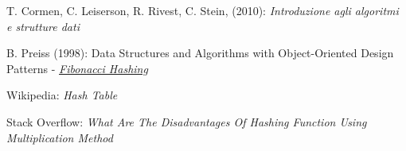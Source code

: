 \newpage

\begin{thebibliography}{}

T. Cormen, C. Leiserson, R. Rivest, C. Stein, (2010): \emph{Introduzione agli algoritmi e strutture dati}

B. Preiss (1998): Data Structures and Algorithms with Object-Oriented Design Patterns - \href{www.google.com}{\emph{Fibonacci Hashing}}

Wikipedia: \emph{Hash Table}

Stack Overflow: \emph{What Are The Disadvantages Of Hashing Function Using Multiplication Method}

\begin{comment}
\bibitem{owolab}
O. Owolab (2003): \emph{Empirical studies of some hashing functions}

\bibitem{maurer_lewis}
W. D. Maurer, T. G. Lewis (1975): \emph{Hash Table Methods}
\end{comment}

\end{thebibliography}

